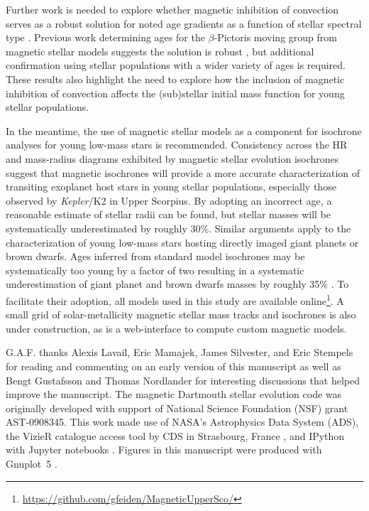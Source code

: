 \documentclass{aa}
\begin{document}
Further work is needed to explore whether magnetic inhibition of convection serves as a robust solution for noted age gradients as a function of stellar spectral type \citep[e.g.,][]{Naylor2009, Herczeg2015}. Previous work determining ages for the $\beta$-Pictoris moving group from magnetic stellar models suggests the solution is robust \citep{MM10, Malo2014, Binks2016}, but additional confirmation using stellar populations with a wider variety of ages is required. These results also highlight the need to explore how the inclusion of magnetic inhibition of convection affects the (sub)stellar initial mass function for young stellar populations.

In the meantime, the use of magnetic stellar models as a component for isochrone analyses for young low-mass stars is recommended. Consistency across the HR and mass-radius diagrams exhibited by magnetic stellar evolution isochrones suggest that magnetic isochrones will provide a more accurate characterization of transiting exoplanet host stars in young stellar populations, especially those observed by \emph{Kepler}/K2 in Upper Scorpius. By adopting an incorrect age, a reasonable estimate of stellar radii can be found, but stellar masses will be systematically underestimated by roughly 30\%. Similar arguments apply to the characterization of young low-mass stars hosting directly imaged giant planets or brown dwarfs. Ages inferred from standard model isochrones may be systematically too young by a factor of two resulting in a systematic underestimation of giant planet and brown dwarfs masses by roughly 35\% \citep{Baraffe2003}. To facilitate their adoption, all models used in this study are available online\footnote{\url{https://github.com/gfeiden/MagneticUpperSco/}}. A small grid of solar-metallicity magnetic stellar mass tracks and isochrones is also under construction, as is a web-interface to compute custom magnetic models.

\begin{acknowledgements}
G.A.F. thanks Alexis Lavail, Eric Mamajek, James Silvester, and Eric Stempels for reading and commenting on an early version of this manuscript as well as Bengt Gustafsson and Thomas Nordlander for interesting discussions that helped improve the manuscript. The magnetic Dartmouth stellar evolution code was originally developed with support of National Science Foundation (NSF) grant AST-0908345. This work made use of NASA's Astrophysics Data System (ADS), the VizieR catalogue access tool by CDS in Strasbourg, France \citep{Ochsenbein2000}, and IPython with Jupyter notebooks \citep{Perez2007}. Figures in this manuscript were produced with Gnuplot~5 \citep{Gnuplot5.0}.
\end{acknowledgements}
\end{document}
